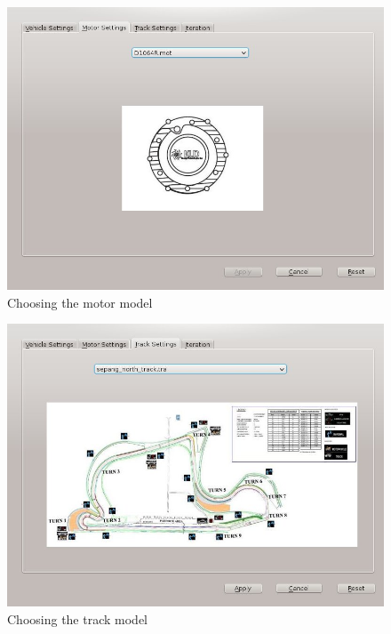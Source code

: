 \begin{figure}[htb]
	\centering
	\includegraphics[width=5in]{images/motor_settings.jpg}
	\caption{Choosing the motor model}
	\label{im:motorSettings}
\end{figure}

\begin{figure}[htb]
	\centering
	\includegraphics[width=5in]{images/track_settings.jpg}
	\caption{Choosing the track model}
	\label{im:trackSettings}
\end{figure}

